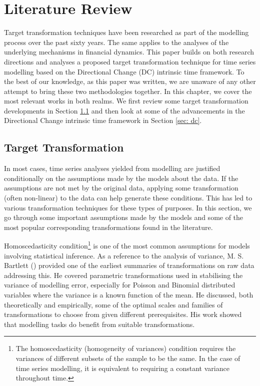 \chapter{Literature Review}\label{ch: literature review}

Target transformation techniques have been researched as part of the modelling process over the past sixty years. The same applies to the analyses of the underlying mechanisms in financial dynamics. This paper builds on both research directions and analyses a proposed target transformation technique for time series modelling based on the Directional Change (DC) intrinsic time framework. To the best of our knowledge, as this paper was written, we are unaware of any other attempt to bring these two methodologies together. In this chapter, we cover the most relevant works in both realms. We first review some target transformation developments in Section \ref{sec: target transformation} and then look at some of the advancements in the Directional Change intrinsic time framework in Section \ref{sec: dc}.

\section{Target Transformation}\label{sec: target transformation}

In most cases, time series analyses yielded from modelling are justified conditionally on the assumptions made by the models about the data. If the assumptions are not met by the original data, applying some transformation (often non-linear) to the data can help generate these conditions. This has led to various transformation techniques for these types of purposes. In this section, we go through some important assumptions made by the models and some of the most popular corresponding transformations found in the literature.

Homoscedasticity condition\footnote{The homoscedasticity (homogeneity of variances) condition requires the variances of different subsets of the sample to be the same. In the case of time series modelling, it is equivalent to requiring a constant variance throughout time.} is one of the most common assumptions for models involving statistical inference. As a reference to the analysis of variance, M. S. Bartlett (\citeyear{10.2307/3001536}) provided one of the earliest summaries of transformations on raw data addressing this. He covered parametric transformations used in stabilising the variance of modelling error, especially for Poisson and Binomial distributed variables where the variance is a known function of the mean. He discussed, both theoretically and empirically, some of the optimal scales and families of transformations to choose from given different prerequisites. His work showed that modelling tasks do benefit from suitable transformations.

